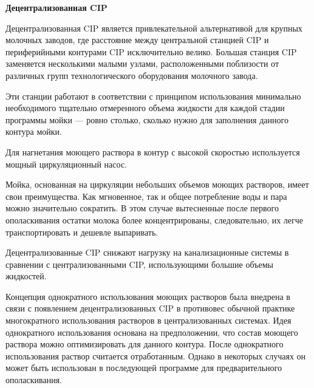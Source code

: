 \documentclass[a4paper,12pt,oneside]{extarticle}
\begin{document}
   \begin{flushleft}
   	\bfseries 	Децентрализованная CIP
   \end{flushleft}
   
   \begin{flushleft}
   		Децентрализованная CIP является привлекательной альтернативой для крупных молочных заводов, где расстояние между центральной станцией CIP и периферийными контурами CIP исключительно велико. Большая станция CIP заменяется несколькими малыми узлами, расположенными поблизости от различных групп технологического оборудования молочного завода.
   \end{flushleft}
   
   \begin{flushleft}
   		Эти станции работают в соответствии с принципом использования минимально необходимого тщательно отмеренного объема жидкости для каждой стадии программы мойки — ровно столько, сколько нужно для заполнения данного контура мойки.
   \end{flushleft}
   
   \begin{flushleft}
   	Для нагнетания моющего раствора в контур с высокой скоростью используется мощный циркуляционный насос.
   \end{flushleft}
	
	\begin{flushleft}
		Мойка, основанная на циркуляции небольших объемов моющих растворов, имеет свои преимущества. Как мгновенное, так и общее потребление воды и пара можно значительно сократить. В этом случае вытесненные после первого ополаскивания остатки молока более концентрированы, следовательно, их легче транспортировать и дешевле выпаривать. 
	\end{flushleft}
	
	\begin{flushleft}
		Децентрализованные CIP снижают нагрузку на канализационные системы в сравнении с централизованными CIP, использующими большие объемы жидкостей.
	\end{flushleft}
	
	\begin{flushleft}
		Концепция однократного использования моющих растворов была внедрена в связи с появлением децентрализованных CIP в противовес обычной практике многократного использования растворов в централизованных системах. Идея однократного использования основана на предположении, что состав моющего раствора можно оптимизировать для данного контура. После однократного использования раствор считается отработанным. Однако в некоторых случаях он может быть использован в последующей программе для предварительного ополаскивания.
	\end{flushleft}
	
\end{document}
